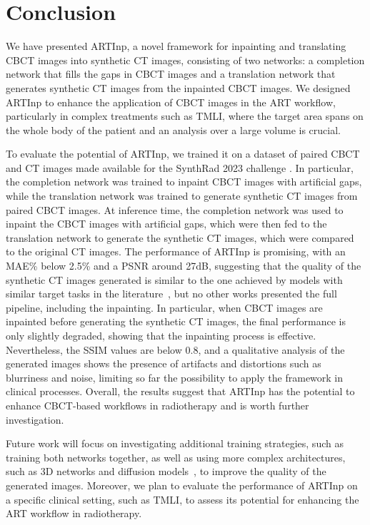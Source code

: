 \section{Conclusion}
\label{sec:conclusion}
We have presented ARTInp, a novel framework for inpainting and translating CBCT images into synthetic CT images, consisting of two networks: a completion network that fills the gaps in CBCT images and a translation network that generates synthetic CT images from the inpainted CBCT images. 
We designed ARTInp to enhance the application of CBCT images in the ART workflow, particularly in complex treatments such as TMLI, where the target area spans on the whole body of the patient and an analysis over a large volume is crucial.

To evaluate the potential of ARTInp, we trained it on a dataset of paired CBCT and CT images made available for the SynthRad 2023 challenge \cite{Thummerer2023}.
In particular, the completion network was trained to inpaint CBCT images with artificial gaps, while the translation network was trained to generate synthetic CT images from paired CBCT images.
At inference time, the completion network was used to inpaint the CBCT images with artificial gaps, which were then fed to the translation network to generate the synthetic CT images, which were compared to the original CT images.
The performance of ARTInp is promising, with an MAE\% below 2.5\% and a PSNR around 27dB, suggesting that the quality of the synthetic CT images generated is similar to the one achieved by models with similar target tasks in the literature~\cite{edmund_review_2017}, but no other works presented the full pipeline, including the inpainting. 
In particular, when CBCT images are inpainted before generating the synthetic CT images, the final performance is only slightly degraded, showing that the inpainting process is effective.
Nevertheless, the SSIM values are below 0.8, and a qualitative analysis of the generated images shows the presence of artifacts and distortions such as blurriness and noise, limiting so far the possibility to apply the framework in clinical processes. 
Overall, the results suggest that ARTInp has the potential to enhance CBCT-based workflows in radiotherapy and is worth further investigation.

Future work will focus on investigating additional training strategies, such as training both networks together, as well as using more complex architectures, such as 3D networks and diffusion models~\cite{Wolleb2022}, to improve the quality of the generated images. 
Moreover, we plan to evaluate the performance of ARTInp on a specific clinical setting, such as TMLI, to assess its potential for enhancing the ART workflow in radiotherapy.
